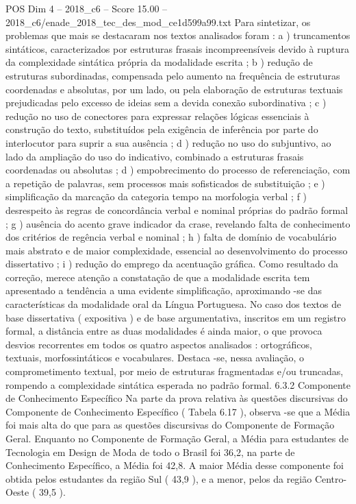\begin{textsample}{POS Dim 4 – 2018\_c6 – Score 15.00 – 2018\_c6/enade\_2018\_tec\_des\_mod\_ce1d599a99.txt}
Para sintetizar, os problemas que mais se destacaram nos textos analisados foram : a ) truncamentos sintáticos, caracterizados por estruturas frasais incompreensíveis devido à ruptura da complexidade sintática própria da modalidade escrita ; b ) redução de estruturas subordinadas, compensada pelo aumento na frequência de estruturas coordenadas e absolutas, por um lado, ou pela elaboração de estruturas textuais prejudicadas pelo excesso de ideias sem a devida conexão subordinativa ; c ) redução no uso de conectores para expressar relações lógicas essenciais à construção do texto, substituídos pela exigência de inferência por parte do interlocutor para suprir a sua ausência ; d ) redução no uso do subjuntivo, ao lado da ampliação do uso do indicativo, combinado a estruturas frasais coordenadas ou absolutas ; d ) empobrecimento do processo de referenciação, com a repetição de palavras, sem processos mais sofisticados de substituição ; e ) simplificação da marcação da categoria tempo na morfologia verbal ; f ) desrespeito às regras de concordância verbal e nominal próprias do padrão formal ; g ) ausência do acento grave indicador da crase, revelando falta de conhecimento dos critérios de regência verbal e nominal ; h ) falta de domínio de vocabulário mais abstrato e de maior complexidade, essencial ao desenvolvimento do processo dissertativo ; i ) redução do emprego da acentuação gráfica.
Como resultado da correção, merece atenção a constatação de que a modalidade escrita tem apresentado a tendência a uma evidente simplificação, aproximando -se das características da modalidade oral da Língua Portuguesa.
No caso dos textos de base dissertativa ( expositiva ) e de base argumentativa, inscritos em um registro formal, a distância entre as duas modalidades é ainda maior, o que provoca desvios recorrentes em todos os quatro aspectos analisados : ortográficos, textuais, morfossintáticos e vocabulares.
Destaca -se, nessa avaliação, o comprometimento textual, por meio de estruturas fragmentadas e/ou truncadas, rompendo a complexidade sintática esperada no padrão formal. 6.3.2 Componente de Conhecimento Específico Na parte da prova relativa às questões discursivas do Componente de Conhecimento Específico ( Tabela 6.17 ), observa -se que a Média foi mais alta do que para as questões discursivas do Componente de Formação Geral.
Enquanto no Componente de Formação Geral, a Média para estudantes de Tecnologia em Design de Moda de todo o Brasil foi 36,2, na parte de Conhecimento Específico, a Média foi 42,8.
A maior Média desse componente foi obtida pelos estudantes da região Sul ( 43,9 ), e a menor, pelos da região Centro-Oeste ( 39,5 ).

\end{textsample}

